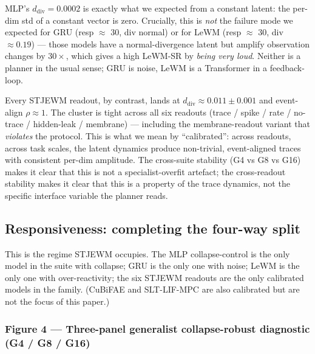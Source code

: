 \documentclass{article}
\begin{document}
MLP's $d_{\text{div}} = 0.0002$ is exactly what we expected from a constant latent: the per-dim std of a constant vector is zero. Crucially, this is \emph{not} the failure mode we expected for GRU (resp $\approx$ 30, div normal) or for LeWM (resp $\approx$ 30, div $\approx 0.19$) --- those models have a normal-divergence latent but amplify observation changes by $30\times$, which gives a high LeWM-SR by \emph{being very loud}. Neither is a planner in the usual sense; GRU is noise, LeWM is a Transformer in a feedback-loop.

Every STJEWM readout, by contrast, lands at $d_{\text{div}} \approx 0.011 \pm 0.001$ and event-align $\rho \approx 1$. The cluster is tight across all six readouts (trace / spike / rate / no-trace / hidden-leak / membrane) --- including the membrane-readout variant that \emph{violates} the protocol. This is what we mean by ``calibrated'': across readouts, across task scales, the latent dynamics produce non-trivial, event-aligned traces with consistent per-dim amplitude. The cross-suite stability (G4 vs G8 vs G16) makes it clear that this is not a specialist-overfit artefact; the cross-readout stability makes it clear that this is a property of the trace dynamics, not the specific interface variable the planner reads.

\subsection{Responsiveness: completing the four-way split}

This is the regime STJEWM occupies. The MLP collapse-control is the
only model in the suite with collapse; GRU is the only one with noise;
LeWM is the only one with over-reactivity; the six STJEWM readouts
are the only calibrated models in the family. (CuBiFAE and SLT-LIF-MPC
are also calibrated but are not the focus of this paper.)

\subsubsection*{Figure 4 --- Three-panel generalist collapse-robust diagnostic (G4 / G8 / G16)}
\end{document}
